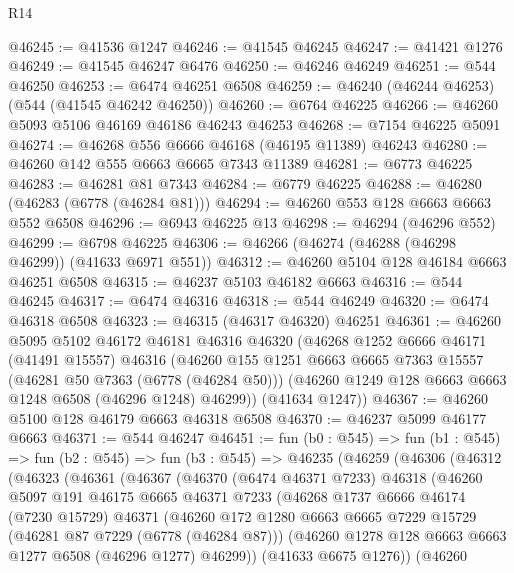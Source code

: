 \begin{lexlean}{R14}
\begin{coremodule}
@46245 := @41536 @1247
@46246 := @41545 @46245
@46247 := @41421 @1276
@46249 := @41545 @46247 @6476
@46250 := @46246 @46249
@46251 := @544 @46250
@46253 := @6474 @46251 @6508
@46259 := @46240 (@46244 @46253) (@544 (@41545 @46242 @46250))
@46260 := @6764 @46225
@46266 := @46260 @5093 @5106 @46169 @46186 @46243 @46253
@46268 := @7154 @46225 @5091
@46274 := @46268 @556 @6666 @46168 (@46195 @11389) @46243
@46280 := @46260 @142 @555 @6663 @6665 @7343 @11389
@46281 := @6773 @46225
@46283 := @46281 @81 @7343
@46284 := @6779 @46225
@46288 := @46280 (@46283 (@6778 (@46284 @81)))
@46294 := @46260 @553 @128 @6663 @6663 @552 @6508
@46296 := @6943 @46225 @13
@46298 := @46294 (@46296 @552)
@46299 := @6798 @46225
@46306 := @46266 (@46274 (@46288 (@46298 @46299)) (@41633 @6971 @551))
@46312 := @46260 @5104 @128 @46184 @6663 @46251 @6508
@46315 := @46237 @5103 @46182 @6663
@46316 := @544 @46245
@46317 := @6474 @46316
@46318 := @544 @46249
@46320 := @6474 @46318 @6508
@46323 := @46315 (@46317 @46320) @46251
@46361 := @46260
    @5095
    @5102
    @46172
    @46181
    @46316
    @46320
    (@46268
      @1252
      @6666
      @46171
      (@41491 @15557)
      @46316
      (@46260
        @155
        @1251
        @6663
        @6665
        @7363
        @15557
        (@46281 @50 @7363 (@6778 (@46284 @50)))
        (@46260 @1249 @128 @6663 @6663 @1248 @6508 (@46296 @1248) @46299))
      (@41634 @1247))
@46367 := @46260 @5100 @128 @46179 @6663 @46318 @6508
@46370 := @46237 @5099 @46177 @6663
@46371 := @544 @46247
@46451 := fun (b0 : @545) =>
  fun (b1 : @545) =>
  fun (b2 : @545) =>
  fun (b3 : @545) =>
  @46235
    (@46259
      (@46306
        (@46312
          (@46323
            (@46361
              (@46367
                (@46370
                  (@6474 @46371 @7233)
                  @46318
                  (@46260
                    @5097
                    @191
                    @46175
                    @6665
                    @46371
                    @7233
                    (@46268
                      @1737
                      @6666
                      @46174
                      (@7230 @15729)
                      @46371
                      (@46260
                        @172
                        @1280
                        @6663
                        @6665
                        @7229
                        @15729
                        (@46281 @87 @7229 (@6778 (@46284 @87)))
                        (@46260 @1278 @128 @6663 @6663 @1277 @6508 (@46296 @1277) @46299))
                      (@41633 @6675 @1276))
                    (@46260

\end{coremodule}
\end{lexlean}
